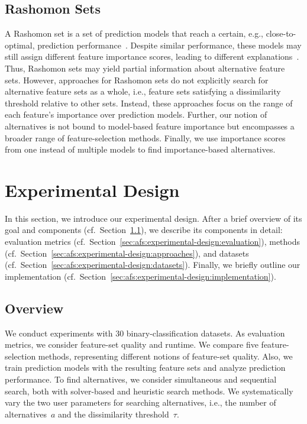 \documentclass{article}
\theoremstyle{definition}
\begin{document}
\subsection{Rashomon Sets}
\label{sec:afs-related-work:rashomon-sets}

A Rashomon set is a set of prediction models that reach a certain, e.g., close-to-optimal, prediction performance~\cite{fisher2019all}.
Despite similar performance, these models may still assign different feature importance scores, leading to different explanations~\cite{laberge2023partial}.
Thus, Rashomon sets may yield partial information about alternative feature sets.
However, approaches for Rashomon sets do not explicitly search for alternative feature sets as a whole, i.e., feature sets satisfying a dissimilarity threshold relative to other sets.
Instead, these approaches focus on the range of each feature's importance over prediction models.
Further, our notion of alternatives is not bound to model-based feature importance but encompasses a broader range of feature-selection methods.
Finally, we use importance scores from one instead of multiple models to find importance-based alternatives.

\section{Experimental Design}
\label{sec:afs:experimental-design}

In this section, we introduce our experimental design.
After a brief overview of its goal and components (cf.~Section~\ref{sec:afs:experimental-design:overview}), we describe its components in detail:
evaluation metrics (cf.~Section~\ref{sec:afs:experimental-design:evaluation}), methods (cf.~Section~\ref{sec:afs:experimental-design:approaches}), and datasets (cf.~Section~\ref{sec:afs:experimental-design:datasets}).
Finally, we briefly outline our implementation (cf.~Section~\ref{sec:afs:experimental-design:implementation}).

\subsection{Overview}
\label{sec:afs:experimental-design:overview}

We conduct experiments with 30 binary-classification datasets.
As evaluation metrics, we consider feature-set quality and runtime.
We compare five feature-selection methods, representing different notions of feature-set quality.
Also, we train prediction models with the resulting feature sets and analyze prediction performance.
To find alternatives, we consider simultaneous and sequential search, both with solver-based and heuristic search methods.
We systematically vary the two user parameters for searching alternatives, i.e., the number of alternatives~$a$ and the dissimilarity threshold~$\tau$.
\end{document}
